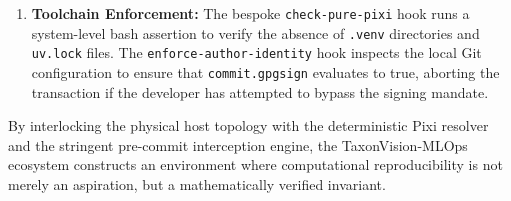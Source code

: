 \begin{enumerate}
    \item \textbf{Toolchain Enforcement:} The bespoke \texttt{check-pure-pixi} hook runs a system-level bash assertion to verify the absence of \texttt{.venv} directories and\\\texttt{uv.lock} files. The \texttt{enforce-author-identity} hook inspects the local Git configuration to ensure that \texttt{commit.gpgsign} evaluates to true, aborting the transaction if the developer has attempted to bypass the signing mandate.
\end{enumerate}

By interlocking the physical host topology with the deterministic Pixi resolver and the stringent pre-commit interception engine, the TaxonVision-MLOps ecosystem constructs an environment where computational reproducibility is not merely an aspiration, but a mathematically verified invariant.
